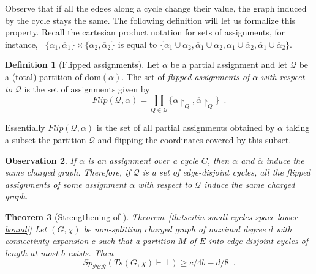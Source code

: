 \documentclass[11pt]{article}
\numberwithin{equation}{section}
\newtheorem{theorem}{Theorem}[section]
\theoremstyle{definition}
\newtheorem{definition}[theorem]{Definition}
\theoremstyle{plain}
\newcommand{\expref}[2]{\hyperref[#2]{#1~\ref{#2}}}
\theoremstyle{plain}
\newtheorem{observation}[theorem]{Observation}
\theoremstyle{definition}
\newcommand{\domainof}[1]{\ensuremath{\mathrm{dom} ( #1 )}}
\newcommand{\set}[1]{\{ #1 \}}
\newcommand{\introduceterm}[1]{{\emph{#1}}}
\newcommand{\eqperiod}{\enspace .}
\newcommand{\egComma}{for instance,\ }
\newcommand{\proofsystemsubindexformat}[1]{\scriptscriptstyle{\mathcal{#1}}}
\newcommand{\pcrnot}{\proofsystemsubindexformat{PCR}}
\newcommand{\restrict}[2]{{{#1}\!\!\upharpoonright_{#2}}}
\newcommand{\derivabbrevsmall}[2]{( #1 \vdash #2 )}
\newcommand{\refutabbrevsmall}[1]{\derivabbrevsmall{#1}{\!\bot}}
\newcommand{\genericrefsmall}[3]{{\mathit{#1}}_{#2}\refutabbrevsmall{#3}}
\newcommand{\mspaceref}[2][]{\genericrefsmall{Sp}{#1}{#2}}
\newcommand{\formulaformat}[1]{\mathit{#1}}
\newcommand{\tseitinnot}[2]{\formulaformat{Ts}({#1,#2})}
\newcommand{\connectivityexpansionnot}{c}
\newcommand{\cyclelengthnot}{b}
\newcommand{\oppositeassignment}[1]{\overline{#1}}
\newcommand{\chargedgraph}{charged graph\xspace}
\newcommand{\Gnonsplittingnot}{non-splitting\xspace}
\newcommand{\Gnonsplitting}{\Gnonsplittingnot}
\newcommand{\flippedassignments}{flipped assignments\xspace}
\newcommand{\Flippedassignments}{Flipped assignments\xspace}
\newcommand{\flip}[2]{\mathit{Flip}(#1,#2)}
\newcommand{\partitionnot}{\mathcal{Q}}
\newcommand{\tseitincharge}{\chi}
\begin{document}
Observe that if all the edges along a cycle change their value, the
graph induced by the cycle stays the same. The following definition
will let us formalize this property. Recall the cartesian product
notation for sets of assignments, \egComma
%
$\{\alpha_{1}, \oppositeassignment{\alpha}_{1}\}
\times
\{\alpha_{2}, \oppositeassignment{\alpha}_{2}\}$ is equal to
%
$\{\alpha_{1} \cup \alpha_{2}, \oppositeassignment{\alpha}_{1} \cup
\alpha_{2}, \alpha_{1} \cup \oppositeassignment{\alpha}_{2},
\oppositeassignment{\alpha}_{1} \cup \oppositeassignment{\alpha}_{2}
\}$.


\begin{definition}[\Flippedassignments]
  \label{def:flippedassignments}
  Let $\alpha$ be a partial assignment and let $\partitionnot$ be a (total) partition of $\domainof{\alpha}$. The set of \introduceterm{\flippedassignments of $\alpha$ with respect to $\partitionnot$} is the set of assignments given by
  \begin{equation*}
    \flip{\partitionnot}{\alpha}=\prod_{Q\in\partitionnot}\set{\restrict{\alpha}{Q},\restrict{\oppositeassignment{\alpha}}{Q}} \eqperiod
  \end{equation*}
\end{definition}

Essentially $\flip{\partitionnot}{\alpha}$ is the set of all partial
assignments obtained by $\alpha$ taking a subset the partition
$\partitionnot$ and flipping the coordinates covered by this subset.

\begin{observation}
  \label{obs:flipping-respects-induced}
  If $\alpha$ is an assignment over a cycle $C$, then $\alpha$ and $\oppositeassignment{\alpha}$ induce the same \chargedgraph. Therefore, if $\partitionnot$ is a set of edge-disjoint cycles, all the \flippedassignments of some assignment $\alpha$ with respect to $\partitionnot$ induce the same \chargedgraph.
\end{observation}

\begin{theorem}[Strengthening of \expref{Theorem}{th:tseitin-small-cycles-space-lower-bound}]
  \label{th:tseitin-small-cycles-space-lower-bound-strengthened}
  Let $(G,\tseitincharge)$ be \Gnonsplitting \chargedgraph of maximal degree $d$ with connectivity expansion $\connectivityexpansionnot$ such that a partition $M$ of $E$ into edge-disjoint cycles of length at most $\cyclelengthnot$ exists. Then
  \begin{equation*}
    \mspaceref[\pcrnot]{\tseitinnot{G}{\tseitincharge}}\geq \connectivityexpansionnot/4\cyclelengthnot -d/8 \eqperiod
  \end{equation*}
\end{theorem}
\end{document}
